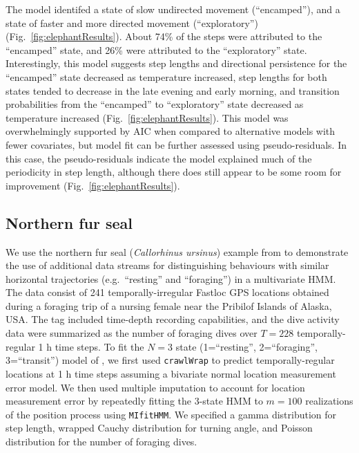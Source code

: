 \documentclass[12pt]{article}\usepackage[]{graphicx}\usepackage[]{color}
\begin{document}
The model identifed a state of slow undirected movement (``encamped''), and a state of faster and more directed movement (``exploratory'') (Fig.\ \ref{fig:elephantResults}). About 74\% of the steps were attributed to the ``encamped'' state, and 26\% were attributed to the ``exploratory'' state. Interestingly, this model suggests step lengths and directional persistence for the ``encamped'' state decreased as temperature increased, step lengths for both states tended to decrease in the late evening and early morning, and transition probabilities from the ``encamped'' to ``exploratory'' state decreased as temperature increased (Fig.\ \ref{fig:elephantResults}). This model was overwhelmingly supported by AIC when compared to alternative models with fewer covariates, but model fit can be further assessed using pseudo-residuals.  In this case, the pseudo-residuals indicate the model explained much of the periodicity in step length, although there does still appear to be some room for improvement (Fig.\ \ref{fig:elephantResults}).

\subsection{Northern fur seal}
\label{sec:nfs}
We use the northern fur seal ({\it Callorhinus ursinus}) example from \cite{McClintockEtAl2014b} to demonstrate the use of additional data streams for distinguishing behaviours with similar horizontal trajectories (e.g.\ ``resting'' and ``foraging'') in a multivariate HMM. The data consist of 241 temporally-irregular Fastloc GPS locations obtained during a foraging trip of a nursing female near the Pribilof Islands of Alaska, USA. The tag included time-depth recording capabilities, and the dive activity data were summarized as the number of foraging dives over $T=228$ temporally-regular 1 h time steps. To fit the $N=3$ state (1=``resting'', 2=``foraging'', 3=``transit'') model of \cite{McClintockEtAl2014b}, we first used \verb|crawlWrap| to predict temporally-regular locations at 1 h time steps assuming a bivariate normal location measurement error model. %
We then used multiple imputation to account for location measurement error by repeatedly fitting the 3-state HMM to $m=100$ realizations of the position process using \verb|MIfitHMM|. We specified a gamma distribution for step length, wrapped Cauchy distribution for turning angle, and Poisson distribution for the number of foraging dives. %
\end{document}
